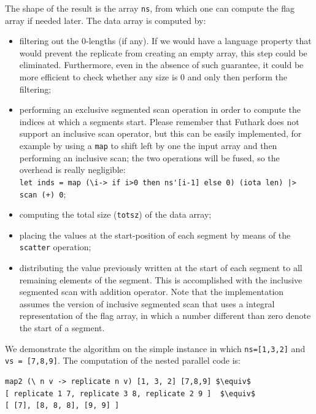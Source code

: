 \documentclass[acmsmall,review]{acmart}\settopmatter{printfolios=true,printccs=false,printacmref=false}
\begin{document}
The shape of the result is the array {\tt ns}, from which one can
compute the flag array if needed later.   The data array is computed by:
\begin{itemize}
    \item filtering out the $0$-lengths (if any). If we would 
            have a language property that would prevent the replicate
            from creating an empty array, this step could be eliminated.
            Furthermore, even in the absence of such guarantee, it
            could be more efficient to check whether any size
            is $0$ and only then perform the filtering;  
    \item performing an exclusive segmented scan operation in order
            to compute the indices at which a segments start.
          Please remember that Futhark does not support an inclusive
            scan operator, but this can be easily implemented,
            for example by using a \lstinline{map} to shift left by one
            the input array and then performing an inclusive scan;
            the two operations will be fused, so the overhead is really 
            negligible:\\
            \lstinline{let inds = map (\i-> if i>0 then ns'[i-1] else 0) (iota len) |> scan (+) 0};
    \item computing the total size ({\tt totsz}) of the data array;
    \item placing the values at the start-position of each segment
            by means of the \lstinline{scatter} operation;
    \item distributing the value previously written at the start of
            each segment to all remaining elements of the segment.
            This is accomplished with the inclusive segmented
            scan with addition operator. Note that the implementation
            assumes the version of inclusive segmented scan that uses
            a integral representation of the flag array, in which
            a number different than zero denote the start of a segment. 
\end{itemize}

We demonstrate the algorithm on the simple instance in which {\tt ns=[1,3,2]}
and {\tt vs = [7,8,9]}.
The computation of the nested parallel code is:
\begin{lstlisting}[mathescape=true]
map2 (\ n v -> replicate n v) [1, 3, 2] [7,8,9] $\equiv$
[ replicate 1 7, replicate 3 8, replicate 2 9 ]  $\equiv$
[ [7], [8, 8, 8], [9, 9] ]
\end{lstlisting}\vspace{-2ex}
\end{document}
